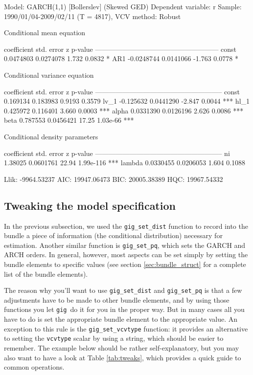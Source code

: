 \documentclass[a4paper,11pt]{article}
\newcommand{\gig}{\texttt{gig}}
\begin{document}
\begin{code}
Model: GARCH(1,1) [Bollerslev] (Skewed GED)
Dependent variable: r
Sample: 1990/01/04-2009/02/11 (T = 4817), VCV method: Robust

    Conditional mean equation

             coefficient   std. error     z      p-value
  ------------------------------------------------------
  const       0.0474803    0.0274078     1.732   0.0832  *
  AR1        -0.0248744    0.0141066    -1.763   0.0778  *

    Conditional variance equation

             coefficient   std. error      z      p-value 
  --------------------------------------------------------
  const       0.169134     0.183983      0.9193   0.3579  
  lv_1       -0.125632     0.0441290    -2.847    0.0044   ***
  hl_1        0.425972     0.116401      3.660    0.0003   ***
  alpha       0.0331390    0.0126196     2.626    0.0086   ***
  beta        0.787553     0.0456421    17.25     1.03e-66 ***

    Conditional density parameters

             coefficient   std. error     z       p-value 
  --------------------------------------------------------
  ni          1.38025      0.0601761    22.94    1.99e-116 ***
  lambda      0.0330455    0.0206053     1.604   0.1088   

	Llik:  -9964.53237	 AIC:  19947.06473
	BIC:   20005.38389	 HQC:  19967.54332
\end{code}

\subsection{Tweaking the model specification}
\label{sec:tweak}

In the previous subsection, we used the \texttt{gig\_set\_dist}
function to record into the bundle a piece of information (the
conditional distribution) necessary for estimation. Another similar
function is \texttt{gig\_set\_pq}, which sets the GARCH and ARCH
orders. In general, however, most aspects can be set simply by setting
the bundle elements to specific values (see section
\ref{sec:bundle_struct} for a complete list of the bundle elements).

The reason why you'll want to use \texttt{gig\_set\_dist} and
\texttt{gig\_set\_pq} is that a few adjustments have to be made to
other bundle elements, and by using those functions you let \gig\ do
it for you in the proper way. But in many cases all you have to do is
set the appropriate bundle element to the appropriate value. An
exception to this rule is the \texttt{gig\_set\_vcvtype} function: it
provides an alternative to setting the \texttt{vcvtype} scalar by
using a string, which should be easier to remember. The example below
should be rather self-explanatory, but you may also want to have a
look at Table \ref{tab:tweaks}, which provides a quick guide to common
operations.
\end{document}
